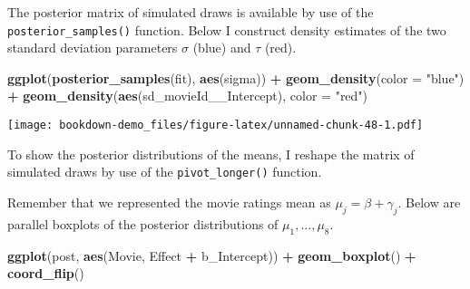 \documentclass[
]{book}
\newenvironment{Shaded}{\begin{snugshade}}{\end{snugshade}}
\newcommand{\DataTypeTok}[1]{\textcolor[rgb]{0.13,0.29,0.53}{#1}}
\newcommand{\KeywordTok}[1]{\textcolor[rgb]{0.13,0.29,0.53}{\textbf{#1}}}
\newcommand{\NormalTok}[1]{#1}
\newcommand{\OperatorTok}[1]{\textcolor[rgb]{0.81,0.36,0.00}{\textbf{#1}}}
\newcommand{\StringTok}[1]{\textcolor[rgb]{0.31,0.60,0.02}{#1}}
\begin{document}
The posterior matrix of simulated draws is available by use of the \texttt{posterior\_samples()} function. Below I construct density estimates of the two standard deviation parameters \(\sigma\) (blue) and \(\tau\) (red).

\begin{Shaded}
\begin{Highlighting}[]
\KeywordTok{ggplot}\NormalTok{(}\KeywordTok{posterior_samples}\NormalTok{(fit),}
       \KeywordTok{aes}\NormalTok{(sigma)) }\OperatorTok{+}
\StringTok{  }\KeywordTok{geom_density}\NormalTok{(}\DataTypeTok{color =} \StringTok{"blue"}\NormalTok{) }\OperatorTok{+}
\StringTok{  }\KeywordTok{geom_density}\NormalTok{(}\KeywordTok{aes}\NormalTok{(sd_movieId__Intercept),}
               \DataTypeTok{color =} \StringTok{"red"}\NormalTok{)}
\end{Highlighting}
\end{Shaded}

\texttt{[image: bookdown-demo\_files/figure-latex/unnamed-chunk-48-1.pdf]}

To show the posterior distributions of the means, I reshape the matrix of simulated draws by use of the \texttt{pivot\_longer()} function.

\begin{Shaded}
\end{Shaded}

Remember that we represented the movie ratings mean as \(\mu_j = \beta + \gamma_j\). Below are parallel boxplots of the posterior distributions of \(\mu_1, ..., \mu_8\).

\begin{Shaded}
\begin{Highlighting}[]
\KeywordTok{ggplot}\NormalTok{(post, }\KeywordTok{aes}\NormalTok{(Movie, Effect }\OperatorTok{+}\StringTok{ }\NormalTok{b_Intercept)) }\OperatorTok{+}
\StringTok{  }\KeywordTok{geom_boxplot}\NormalTok{() }\OperatorTok{+}
\StringTok{  }\KeywordTok{coord_flip}\NormalTok{()}
\end{Highlighting}
\end{Shaded}
\end{document}
